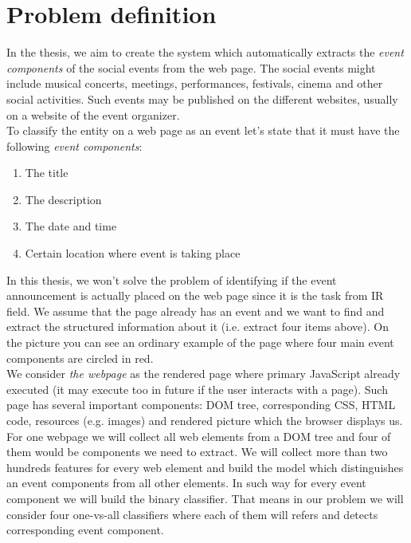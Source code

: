 \section{Problem definition}
In the thesis, we aim to create the system which automatically extracts the \textit{event components} of the social events from the web page. The social events might include musical concerts, meetings, performances, festivals, cinema and other social activities. Such events may be published on the different websites, usually on a website of the event organizer.\\

To classify the entity on a web page as an event let's state that it must have the following \textit{event components}:
\begin{enumerate}
    \item The title
    \item The description
    \item The date and time
    \item Certain location where event is taking place
\end{enumerate}

In this thesis, we won't solve the problem of identifying if the event announcement is actually placed on the web page since it is the task from IR field. We assume that the page already has an event and we want to find and extract the structured information about it (i.e. extract four items above). On the picture  you can see an ordinary example of the page where four main event components are circled in red.\\

We consider \textit{the webpage} as the rendered page where primary JavaScript already executed (it may execute too in future if the user interacts with a page). Such page has several important components: DOM tree, corresponding CSS, HTML code, resources (e.g. images) and rendered picture which the browser displays us. \\

For one webpage we will collect all web elements from a DOM tree and four of them would be components we need to extract. We will collect more than two hundreds features for every web element and build the model which distinguishes an event components from all other elements. In such way for every event component we will build the binary classifier. That means in our problem we will consider four one-vs-all classifiers where each of them will refers and detects corresponding event component. 


